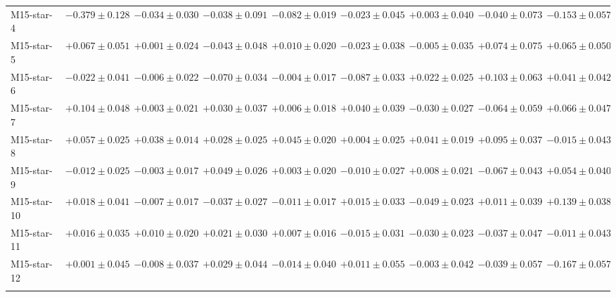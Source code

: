 \begin{table}
\begin{tabular*}{\textheight}{@{\extracolsep\fill}l c c c c c c c c@{}}
M15-star-4 & $-0.379 \pm 0.128$ & $-0.034 \pm 0.030$ & $-0.038 \pm 0.091$ & $-0.082 \pm 0.019$ & $-0.023 \pm 0.045$ & $+0.003 \pm 0.040$ & $-0.040 \pm 0.073$ & $-0.153 \pm 0.057$ \\ 
M15-star-5 & $+0.067 \pm 0.051$ & $+0.001 \pm 0.024$ & $-0.043 \pm 0.048$ & $+0.010 \pm 0.020$ & $-0.023 \pm 0.038$ & $-0.005 \pm 0.035$ & $+0.074 \pm 0.075$ & $+0.065 \pm 0.050$ \\ 
M15-star-6 & $-0.022 \pm 0.041$ & $-0.006 \pm 0.022$ & $-0.070 \pm 0.034$ & $-0.004 \pm 0.017$ & $-0.087 \pm 0.033$ & $+0.022 \pm 0.025$ & $+0.103 \pm 0.063$ & $+0.041 \pm 0.042$ \\ 
M15-star-7 & $+0.104 \pm 0.048$ & $+0.003 \pm 0.021$ & $+0.030 \pm 0.037$ & $+0.006 \pm 0.018$ & $+0.040 \pm 0.039$ & $-0.030 \pm 0.027$ & $-0.064 \pm 0.059$ & $+0.066 \pm 0.047$ \\ 
M15-star-8 & $+0.057 \pm 0.025$ & $+0.038 \pm 0.014$ & $+0.028 \pm 0.025$ & $+0.045 \pm 0.020$ & $+0.004 \pm 0.025$ & $+0.041 \pm 0.019$ & $+0.095 \pm 0.037$ & $-0.015 \pm 0.043$ \\ 
M15-star-9 & $-0.012 \pm 0.025$ & $-0.003 \pm 0.017$ & $+0.049 \pm 0.026$ & $+0.003 \pm 0.020$ & $-0.010 \pm 0.027$ & $+0.008 \pm 0.021$ & $-0.067 \pm 0.043$ & $+0.054 \pm 0.040$ \\ 
M15-star-10 & $+0.018 \pm 0.041$ & $-0.007 \pm 0.017$ & $-0.037 \pm 0.027$ & $-0.011 \pm 0.017$ & $+0.015 \pm 0.033$ & $-0.049 \pm 0.023$ & $+0.011 \pm 0.039$ & $+0.139 \pm 0.038$ \\ 
M15-star-11 & $+0.016 \pm 0.035$ & $+0.010 \pm 0.020$ & $+0.021 \pm 0.030$ & $+0.007 \pm 0.016$ & $-0.015 \pm 0.031$ & $-0.030 \pm 0.023$ & $-0.037 \pm 0.047$ & $-0.011 \pm 0.043$ \\ 
M15-star-12 & $+0.001 \pm 0.045$ & $-0.008 \pm 0.037$ & $+0.029 \pm 0.044$ & $-0.014 \pm 0.040$ & $+0.011 \pm 0.055$ & $-0.003 \pm 0.042$ & $-0.039 \pm 0.057$ & $-0.167 \pm 0.057$ \\ 
\botrule
\end{tabular*}
\end{table}